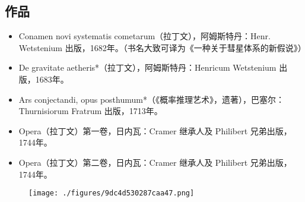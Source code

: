 \subsection{作品}
\begin{itemize}
\item Conamen novi systematis cometarum（拉丁文），阿姆斯特丹：Henr. Wetstenium 出版，1682年。（书名大致可译为《一种关于彗星体系的新假说》）
\item De gravitate aetheris*（拉丁文），阿姆斯特丹：Henricum Wetstenium 出版，1683年。
\item Ars conjectandi, opus posthumum*（《概率推理艺术》，遗著），巴塞尔：Thurnisiorum Fratrum 出版，1713年。
\item Opera（拉丁文）第一卷，日内瓦：Cramer 继承人及 Philibert 兄弟出版，1744年。
\item Opera（拉丁文）第二卷，日内瓦：Cramer 继承人及 Philibert 兄弟出版，1744年。
\end{itemize}

\begin{figure}[ht]
\centering
\texttt{[image: ./figures/9dc4d530287caa47.png]}
\caption{} \label{fig_YGBbnl_6}
\end{figure}
